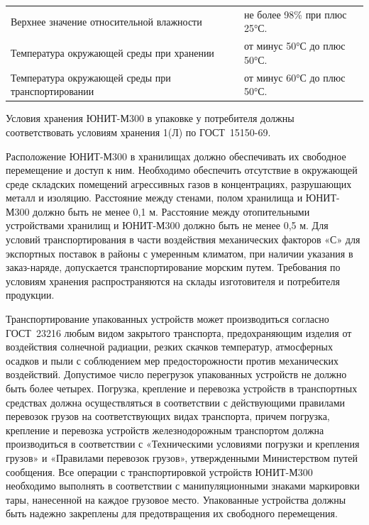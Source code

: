 \vspace{3mm}
\begin{table}[h]
\raggedright
\begin{tabular}{p{10cm}p{5cm}}
Верхнее значение относительной влажности & не более 98\% при плюс 25°С.\\ 
Температура окружающей среды при хранении & от минус 50°С до плюс 50°С. \\
Температура окружающей среды при транспортировании & от минус 60°С до плюс 50°С.\\
\end{tabular}
\end{table}
Условия хранения ЮНИТ-М300 в упаковке у потребителя должны соответствовать условиям хранения 1(Л) по ГОСТ~15150-69.

Расположение ЮНИТ-М300 в хранилищах должно обеспечивать их свободное перемещение и доступ к ним. Необходимо обеспечить отсутствие в окружающей среде складских помещений агрессивных газов в концентрациях, разрушающих металл и изоляцию. 
Расстояние между стенами, полом хранилища и ЮНИТ-М300 должно быть не менее 0,1 м. 
Расстояние  между  отопительными  устройствами  хранилищ  и  ЮНИТ-М300  должно  быть  не  менее 0,5 м. 
Для условий транспортирования в части воздействия механических факторов «С» для экспортных поставок  в  районы  с  умеренным  климатом,  при  наличии  указания  в  заказ-наряде,  допускается 
транспортирование морским путем. 
Требования  по  условиям  хранения  распространяются  на  склады  изготовителя  и  потребителя продукции.

Транспортирование  упакованных  устройств  может  производиться  согласно  ГОСТ~23216 любым видом  закрытого  транспорта,  предохраняющим  изделия  от  воздействия  солнечной  радиации,  резких 
скачков  температур,  атмосферных  осадков  и  пыли  с  соблюдением  мер  предосторожности  против механических воздействий. 
Допустимое число перегрузок упакованных устройств не должно быть более четырех. 
Погрузка,  крепление  и  перевозка  устройств  в  транспортных  средствах  должна  осуществляться  в соответствии  с  действующими  правилами  перевозок  грузов  на  соответствующих  видах  транспорта, причем погрузка, крепление и перевозка устройств железнодорожным транспортом должна производиться в  соответствии  с  «Техническими  условиями  погрузки  и  крепления  грузов»  и  «Правилами  перевозок грузов», утвержденными Министерством путей  сообщения. Все операции с транспортировкой устройств ЮНИТ-М300  необходимо  выполнять  в  соответствии  с  манипуляционными  знаками  маркировки  тары, нанесенной на каждое грузовое место. Упакованные устройства должны быть надежно закреплены для предотвращения их свободного перемещения. 